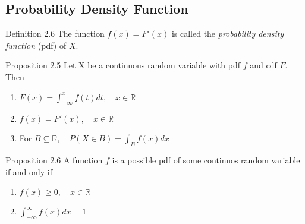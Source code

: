 \subsection{Probability Density Function}
\begin{boks}{Definition 2.6}
The function $f(x) = F'(x)$ is called the \textit{probability density function} (pdf) of $X$.
\end{boks}
\begin{minipage}{0.7\textwidth}
  \begin{boks}{Proposition 2.5}
  Let X be a continuous random variable with pdf $f$ and cdf $F$. Then
  \vspace{5mm}
  \begin{enumerate}
      \item $F(x) = \int_{-\infty}^x f(t)dt, \quad x \in \mathbb{R}$
      \item $f(x) = F'(x), \quad x \in \mathbb{R}$
      \item For $B \subseteq \mathbb{R}, \quad P(X\in B) = \int_B f(x)dx$
  \end{enumerate}
  \end{boks}
\end{minipage}
\begin{boks}{Proposition 2.6}
A function $f$ is a possible pdf of some continuos random variable if and only if
\begin{enumerate}
    \item $f(x) \geq 0, \quad x \in \mathbb{R}$
    \item $\int_{-\infty}^\infty f(x)dx = 1$
\end{enumerate}
\end{boks}


